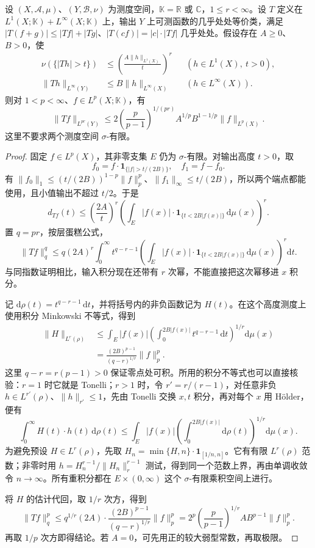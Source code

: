 \begin{proposition}\label{b2:prop:17-off-diagonal}
设 \((X,\mathcal A,\mu)\)、\((Y,\mathcal B,\nu)\) 为测度空间，\(\mathbb K=\mathbb R\) 或 \(\mathbb C\)，\(1\leq r<\infty\)。设 \(T\) 定义在 \(L^1(X;\mathbb K)+L^\infty(X;\mathbb K)\) 上，输出 \(Y\) 上可测函数的几乎处处等价类，满足 \(|T(f+g)|\leq|Tf|+|Tg|\)、\(|T(cf)|=|c|\cdot|Tf|\) 几乎处处。假设存在 \(A\geq0\)、\(B>0\)，使
\[
 \begin{aligned}
 \nu(\{|Th|>t\})&\leq
 \left(\frac{A\|h\|_{L^1(X)}}t\right)^r
 &&(h\in L^1(X),\ t>0),\\
 \|Th\|_{L^\infty(Y)}&\leq B\|h\|_{L^\infty(X)}
 &&(h\in L^\infty(X)).
 \end{aligned}
\]
则对 \(1<p<\infty\)、\(f\in L^p(X;\mathbb K)\)，有
\[
 \|Tf\|_{L^{pr}(Y)}
 \leq 2\left(\frac p{p-1}\right)^{1/(pr)}
 A^{1/p}B^{1-1/p}\|f\|_{L^p(X)}.
\]
这里不要求两个测度空间 \(\sigma\)-有限。
\end{proposition}
\begin{proof}
固定 \(f\in L^p(X)\)，其非零支集 \(E\) 仍为 \(\sigma\)-有限。对输出高度 \(t>0\)，取
\[
 f_0=f\cdot\mathbf1_{\{|f|>t/(2B)\}},
 \quad f_1=f-f_0.
\]
有 \(\|f_0\|_1\leq(t/(2B))^{1-p}\|f\|_p^p\)、\(\|f_1\|_\infty\leq t/(2B)\)，所以两个端点都能使用，且小值输出不超过 \(t/2\)。于是
\[
 d_{Tf}(t)\leq\left(\frac{2A}t\right)^r
 \left(\int_E|f(x)|\cdot\mathbf1_{\{t<2B|f(x)|\}}\,\mathrm d\mu(x)\right)^r.
\]
置 \(q=pr\)，按层蛋糕公式，
\[
 \|Tf\|_q^q\leq q(2A)^r
 \int_0^\infty t^{q-r-1}
 \left(\int_E |f(x)|\cdot\mathbf1_{\{t<2B|f(x)|\}}\,\mathrm d\mu(x)\right)^r\mathrm dt.
\]
与同指数证明相比，输入积分现在还带有 \(r\) 次幂，不能直接把这次幂移进 \(x\) 积分。

记 \(\mathrm d\rho(t)=t^{q-r-1}\,\mathrm dt\)，并将括号内的非负函数记为 \(H(t)\)。在这个高度测度上使用积分 Minkowski 不等式，得到
\[
 \begin{aligned}
 \|H\|_{L^r(\rho)}
 &\leq\int_E |f(x)|
       \left(\int_0^{2B|f(x)|}t^{q-r-1}\,\mathrm dt\right)^{1/r}\mathrm d\mu(x)\\
 &=\frac{(2B)^{p-1}}{(q-r)^{1/r}}\|f\|_p^p.
 \end{aligned}
\]
这里 \(q-r=r(p-1)>0\) 保证零点处可积。所用的积分不等式也可以直接核验：\(r=1\) 时它就是 Tonelli；\(r>1\) 时，令 \(r'=r/(r-1)\)，对任意非负 \(h\in L^{r'}(\rho)\)、\(\|h\|_{r'}\leq1\)，先由 Tonelli 交换 \(x,t\) 积分，再对每个 \(x\) 用 Hölder，便有
\[
 \int_0^\infty H(t)\cdot h(t)\,\mathrm d\rho(t)
 \leq\int_E |f(x)|
       \left(\int_0^{2B|f(x)|}\mathrm d\rho(t)\right)^{1/r}\mathrm d\mu(x).
\]
为避免预设 \(H\in L^r(\rho)\)，先取
\(H_n=\min\{H,n\}\cdot\mathbf1_{[1/n,n]}\)。它有有限 \(L^r(\rho)\) 范数；非零时用
\(h=H_n^{r-1}/\|H_n\|_r^{r-1}\) 测试，得到同一个范数上界，再由单调收敛令 \(n\to\infty\)。所有重积分都在 \(E\times(0,\infty)\) 这个 \(\sigma\)-有限乘积空间上进行。

将 \(H\) 的估计代回，取 \(1/r\) 次方，得到
\[
 \|Tf\|_q^p
 \leq q^{1/r}(2A)\cdot\frac{(2B)^{p-1}}{(q-r)^{1/r}}\|f\|_p^p
 =2^p\left(\frac p{p-1}\right)^{1/r}AB^{p-1}\|f\|_p^p.
\]
再取 \(1/p\) 次方即得结论。若 \(A=0\)，可先用正的较大弱型常数，再取极限。
\end{proof}

